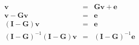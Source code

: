 \begin{eqnarray*}
	\bm{v} &=& \bm{Gv}+\bm{e}\\
	\bm{v}-\bm{Gv} &=& \bm{e}\\
	(\bm{I}-\bm{G})\bm{v} &=& \bm{e}\\
	(\bm{I}-\bm{G})^{-1}(\bm{I}-\bm{G})\bm{v} &=& (\bm{I}-\bm{G})^{-1}\bm{e}\\
\end{eqnarray*}
